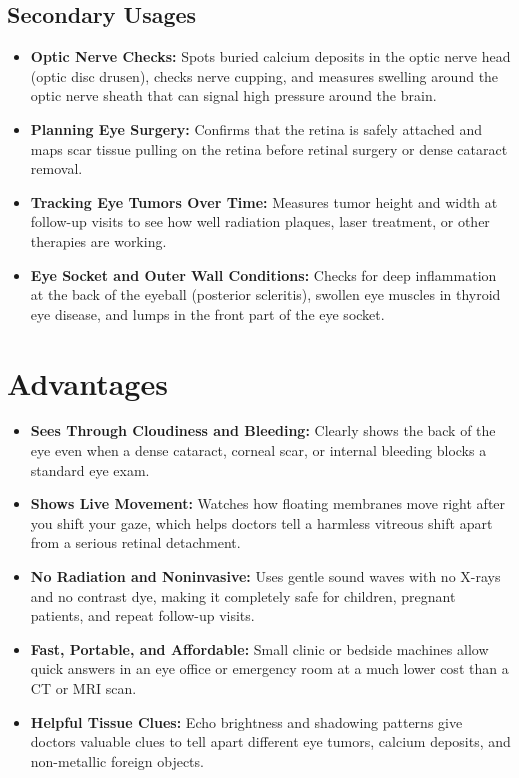 \subsection{Secondary Usages}
\begin{itemize}
    \item \textbf{Optic Nerve Checks:} Spots buried calcium deposits in the optic nerve head (optic disc drusen), checks nerve cupping, and measures swelling around the optic nerve sheath that can signal high pressure around the brain.
    \item \textbf{Planning Eye Surgery:} Confirms that the retina is safely attached and maps scar tissue pulling on the retina before retinal surgery or dense cataract removal.
    \item \textbf{Tracking Eye Tumors Over Time:} Measures tumor height and width at follow-up visits to see how well radiation plaques, laser treatment, or other therapies are working.
    \item \textbf{Eye Socket and Outer Wall Conditions:} Checks for deep inflammation at the back of the eyeball (posterior scleritis), swollen eye muscles in thyroid eye disease, and lumps in the front part of the eye socket.
\end{itemize}

\section{Advantages}
\begin{itemize}
    \item \textbf{Sees Through Cloudiness and Bleeding:} Clearly shows the back of the eye even when a dense cataract, corneal scar, or internal bleeding blocks a standard eye exam.
    \item \textbf{Shows Live Movement:} Watches how floating membranes move right after you shift your gaze, which helps doctors tell a harmless vitreous shift apart from a serious retinal detachment.
    \item \textbf{No Radiation and Noninvasive:} Uses gentle sound waves with no X-rays and no contrast dye, making it completely safe for children, pregnant patients, and repeat follow-up visits.
    \item \textbf{Fast, Portable, and Affordable:} Small clinic or bedside machines allow quick answers in an eye office or emergency room at a much lower cost than a CT or MRI scan.
    \item \textbf{Helpful Tissue Clues:} Echo brightness and shadowing patterns give doctors valuable clues to tell apart different eye tumors, calcium deposits, and non-metallic foreign objects.
\end{itemize}

